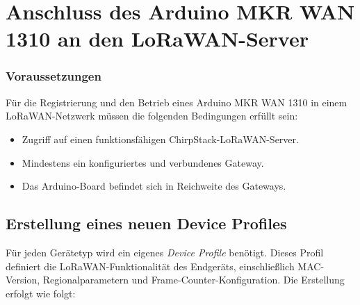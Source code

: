 \section{Anschluss des Arduino MKR WAN 1310 an den LoRaWAN-Server}

\subsubsection{Voraussetzungen}
Für die Registrierung und den Betrieb eines Arduino MKR WAN 1310 in einem LoRaWAN-Netzwerk müssen die folgenden Bedingungen erfüllt sein:
\begin{itemize}
	\item Zugriff auf einen funktionsfähigen ChirpStack-LoRaWAN-Server.
	\item Mindestens ein konfiguriertes und verbundenes Gateway.
	\item Das Arduino-Board befindet sich in Reichweite des Gateways.
\end{itemize}

\subsection{Erstellung eines neuen Device Profiles \label{chirpstack:devProfile}}
	Für jeden Gerätetyp wird ein eigenes \textit{Device Profile} benötigt. Dieses Profil definiert die LoRaWAN-Funktionalität des Endgeräts, einschlie{\ss}lich MAC-Version, Regionalparametern und Frame-Counter-Konfiguration. Die Erstellung erfolgt wie folgt:
	
